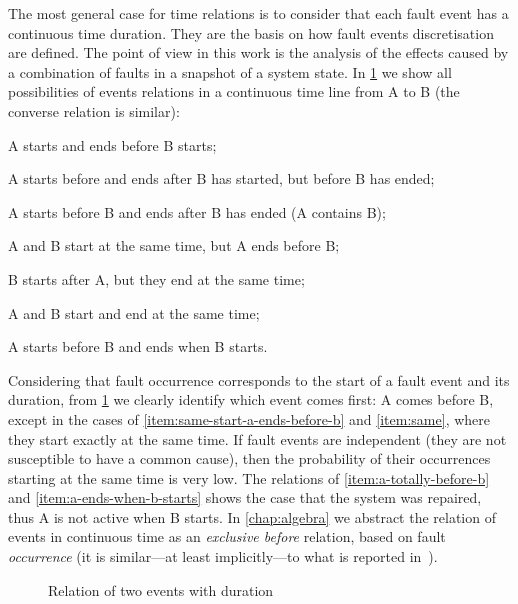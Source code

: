 The most general case for time relations is to consider that each fault event has a continuous time duration.
They are the basis on how fault events discretisation are defined.
The point of view in this work is the analysis of the effects caused by a combination of faults in a snapshot of a system state.
In \cref{fig:time-relations} we show all possibilities of events relations in a continuous time line from A to B (the converse relation is similar):

\begin{alineas}
  \item\label{item:a-totally-before-b} A starts and ends before B starts;
  \item\label{item:intersect-end-a-start-b} A starts before and ends after B has started, but before B has ended;
  \item\label{item:a-contains-b} A starts before B and ends after B has ended (A contains B);
  \item\label{item:same-start-a-ends-before-b} A and B start at the same time, but A ends before B;
  \item\label{item:intersect-end-a-b} B starts after A, but they end at the same time;
  \item\label{item:same} A and B start and end at the same time;
  \item\label{item:a-ends-when-b-starts} A starts before B and ends when B starts.
\end{alineas}

Considering that fault occurrence corresponds to the start of a fault event and its duration, from \cref{fig:time-relations} we clearly identify which event comes first: A comes before B, except in the cases of \cref{item:same-start-a-ends-before-b} and \cref{item:same}, where they start exactly at the same time.
If fault events are independent (they are not susceptible to have a common cause), then the probability of their occurrences starting at the same time is very low.
The relations of \cref{item:a-totally-before-b} and \cref{item:a-ends-when-b-starts} shows the case that the system was repaired, thus A is not active when B starts.
In \cref{chap:algebra} we abstract the relation of events in continuous time as an \emph{exclusive before} relation, based on fault \emph{occurrence} (it is similar---at least implicitly---to what is reported in~\cite{WP2009,MRL2011}).

\begin{figure}[htb]
  \centering
  \caption{Relation of two events with duration}
  \label{fig:time-relations}
\end{figure}

